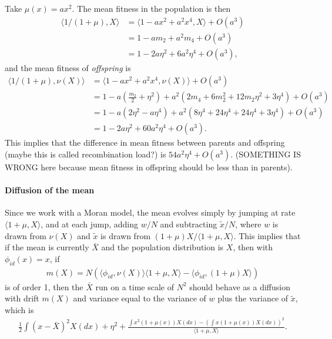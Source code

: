 \documentclass{article}
\newcommand{\ip}[2]{\langle #1, #2 \rangle}
\begin{document}
Take $\mu(x) = ax^2$.
The mean fitness in the population is then
$$\begin{aligned}
    \ip{1/(1+\mu)}{X}
    &=
    \ip{1 - ax^2 + a^2 x^4}{X} + O(a^3) \\
    &=
    1 - a m_2 + a^2 m_4 + O(a^3) \\
    &=
    1 - 2 a \eta^2 + 6 a^2 \eta^4 + O(a^3) ,
\end{aligned}$$
and the mean fitness of \emph{offspring} is
$$\begin{aligned}
    \ip{1/(1+\mu)}{\nu(X)}
    &=
    \ip{1 - ax^2 + a^2 x^4}{\nu(X)} + O(a^3) \\
    &=
    1 - a \left( \frac{m_2}{2} + \eta^2 \right) 
        + a^2 \left( 2 m_4 + 6 m_2^2 + 12 m_2 \eta^2 + 3 \eta^4\right) + O(a^3) \\
    &=
    1 - a \left( 2 \eta^2 - a \eta^4 \right)
        + a^2 \left( 8 \eta^4 + 24 \eta^4 + 24 \eta^4 + 3 \eta^4\right) + O(a^3) \\
    &=
    1 - 2 a \eta^2 + 60 a^2 \eta^4 + O(a^3) .
\end{aligned}$$
This implies that the difference in mean fitness between parents and offspring
(maybe this is called recombination load?)
is $54 a^2 \eta^4 + O(a^3)$.
(SOMETHING IS WRONG here because mean fitness in offspring should be less than in parents).



\paragraph{Diffusion of the mean}
Since we work with a Moran model,
the mean evolves simply by jumping at rate $\ip{1+\mu}{X}$,
and at each jump, adding $w/N$ and subtracting $\tilde x/N$,
where $w$ is drawn from $\nu(X)$ and $\tilde x$ is drawn from 
$(1+\mu)X/\ip{1+\mu}{X}$.
This implies that if the mean is currently $\bar X$
and the population distribution is $X$,
then with $\phi_{id}(x) = x$,
if
\begin{align*}
    m(X) = N \left( \ip{\phi_{id}}{\nu(X)}\ip{1+\mu}{X}
    -
    \ip{\phi_{id}}{(1+\mu)X} \right)
\end{align*}
is of order 1,
then
the $\bar X$ run on a time scale of $N^2$
should behave as a diffusion with drift $m(X)$
and variance equal to the variance of $w$ plus the variance of $\tilde x$, which is
\begin{align*}
    \frac{1}{2} \int (x-\bar X)^2 X(dx) + \eta^2
    + \frac{ \int x^2 (1+\mu(x)) X(dx)  
    - \left(\int x (1+\mu(x)) X(dx)\right)^2 }{ \ip{1+\mu}{X} } .
\end{align*}
\end{document}
